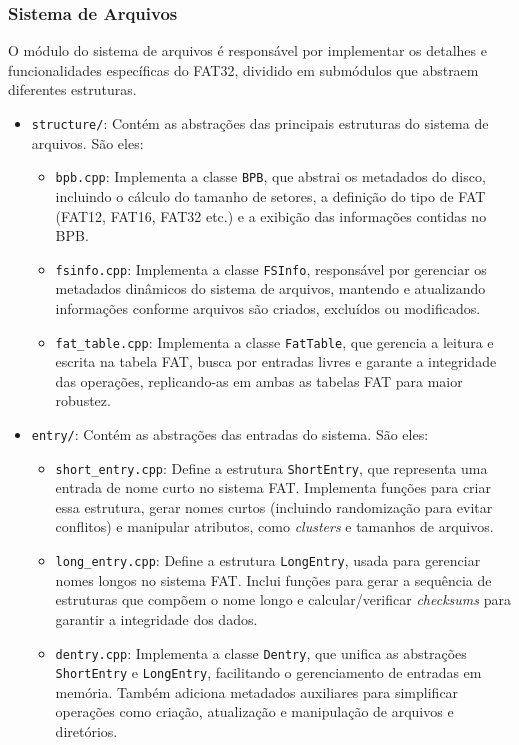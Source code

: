 \documentclass[
    12pt,				%
    oneside,   	        %
    a4paper,			%
    english,			%
    french,				%
    spanish,			%
    brazil,				%
    ]{pacotes/abntex2}
\begin{document}
\subsubsection{Sistema de Arquivos}
\label{subsubsec:fs}

O módulo do sistema de arquivos é responsável por implementar os detalhes e funcionalidades específicas do FAT32, dividido em submódulos que abstraem diferentes estruturas.

\begin{itemize}
    \item \texttt{structure/}: Contém as abstrações das principais estruturas do sistema de arquivos. São eles:
    \begin{itemize}
        \item \texttt{bpb.cpp}: Implementa a classe \texttt{BPB}, que abstrai os metadados do disco, incluindo o cálculo do tamanho de setores, a definição do tipo de FAT (FAT12, FAT16, FAT32 etc.) e a exibição das informações contidas no BPB.
        \item \texttt{fsinfo.cpp}: Implementa a classe \texttt{FSInfo}, responsável por gerenciar os metadados dinâmicos do sistema de arquivos, mantendo e atualizando informações conforme arquivos são criados, excluídos ou modificados.
        \item \texttt{fat\_table.cpp}: Implementa a classe \texttt{FatTable}, que gerencia a leitura e escrita na tabela FAT, busca por entradas livres e garante a integridade das operações, replicando-as em ambas as tabelas FAT para maior robustez.
    \end{itemize}

    \item \texttt{entry/}: Contém as abstrações das entradas do sistema. São eles:
    \begin{itemize}
        \item \texttt{short\_entry.cpp}: Define a estrutura \texttt{ShortEntry}, que representa uma entrada de nome curto no sistema FAT. Implementa funções para criar essa estrutura, gerar nomes curtos (incluindo randomização para evitar conflitos) e manipular atributos, como \textit{clusters} e tamanhos de arquivos.
        \item \texttt{long\_entry.cpp}: Define a estrutura \texttt{LongEntry}, usada para gerenciar nomes longos no sistema FAT. Inclui funções para gerar a sequência de estruturas que compõem o nome longo e calcular/verificar \textit{checksums} para garantir a integridade dos dados.
        \item \texttt{dentry.cpp}: Implementa a classe \texttt{Dentry}, que unifica as abstrações \texttt{ShortEntry} e \texttt{LongEntry}, facilitando o gerenciamento de entradas em memória. Também adiciona metadados auxiliares para simplificar operações como criação, atualização e manipulação de arquivos e diretórios.
    \end{itemize}
\end{itemize}
\end{document}

